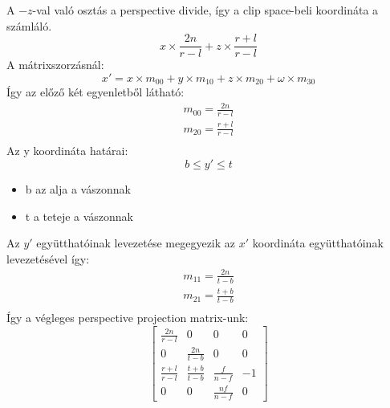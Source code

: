 \documentclass[12pt]{report}
\begin{document}
A $-z$-val való osztás a perspective divide, így a clip space-beli koordináta a számláló.
\[
    x\times\frac{2n}{r-l}+z\times\frac{r+l}{r-l}
\]
A mátrixszorzásnál:
\[
    x'= x\times m_{00}+y\times m_{10}+z\times m_{20}+\omega\times m_{30}
\]
Így az előző két egyenletből látható:
\begin{align*}
    m_{00}=\frac{2n}{r-l}  \\
    m_{20}=\frac{r+l}{r-l} \\
\end{align*}
Az y koordináta határai:
\[
    b \leq y' \leq t
\]
\begin{itemize}
    \item b \text{-} az alja a vászonnak
    \item t \text{-} a teteje a vászonnak
\end{itemize}
Az $y'$ együtthatóinak levezetése megegyezik az $x'$ koordináta együtthatóinak levezetésével így:
\begin{align*}
    m_{11}=\frac{2n}{t-b}  \\
    m_{21}=\frac{t+b}{t-b} \\
\end{align*}
Így a végleges perspective projection matrix-unk:
\[
    \begin{bmatrix}
        \frac{2n}{r-l}  & 0               & 0              & 0  \\
        0               & \frac{2n}{t-b}  & 0              & 0  \\
        \frac{r+l}{r-l} & \frac{t+b}{t-b} & \frac{f}{n-f}  & -1 \\
        0               & 0               & \frac{nf}{n-f} & 0
    \end{bmatrix}
\]
\end{document}
